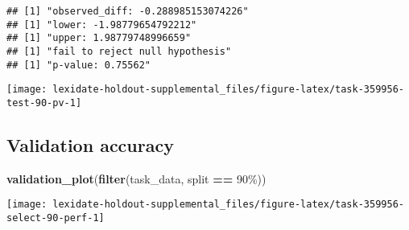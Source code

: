 \documentclass[
]{book}
\newenvironment{Shaded}{\begin{snugshade}}{\end{snugshade}}
\newcommand{\AttributeTok}[1]{\textcolor[rgb]{0.13,0.29,0.53}{#1}}
\newcommand{\DecValTok}[1]{\textcolor[rgb]{0.00,0.00,0.81}{#1}}
\newcommand{\FunctionTok}[1]{\textcolor[rgb]{0.13,0.29,0.53}{\textbf{#1}}}
\newcommand{\NormalTok}[1]{#1}
\newcommand{\OtherTok}[1]{\textcolor[rgb]{0.56,0.35,0.01}{#1}}
\newcommand{\SpecialCharTok}[1]{\textcolor[rgb]{0.81,0.36,0.00}{\textbf{#1}}}
\newcommand{\StringTok}[1]{\textcolor[rgb]{0.31,0.60,0.02}{#1}}
\begin{document}
\begin{Shaded}
\end{Shaded}

\begin{verbatim}
## [1] "observed_diff: -0.288985153074226"
## [1] "lower: -1.98779654792212"
## [1] "upper: 1.98779748996659"
## [1] "fail to reject null hypothesis"
## [1] "p-value: 0.75562"
\end{verbatim}

\texttt{[image: lexidate-holdout-supplemental\_files/figure-latex/task-359956-test-90-pv-1]}

\hypertarget{validation-accuracy-28}{%
\subsection{Validation accuracy}\label{validation-accuracy-28}}

\begin{Shaded}
\begin{Highlighting}[]
\FunctionTok{validation\_plot}\NormalTok{(}\FunctionTok{filter}\NormalTok{(task\_data, split }\SpecialCharTok{==} \StringTok{\textquotesingle{}90\%\textquotesingle{}}\NormalTok{))}
\end{Highlighting}
\end{Shaded}

\texttt{[image: lexidate-holdout-supplemental\_files/figure-latex/task-359956-select-90-perf-1]}
\end{document}
